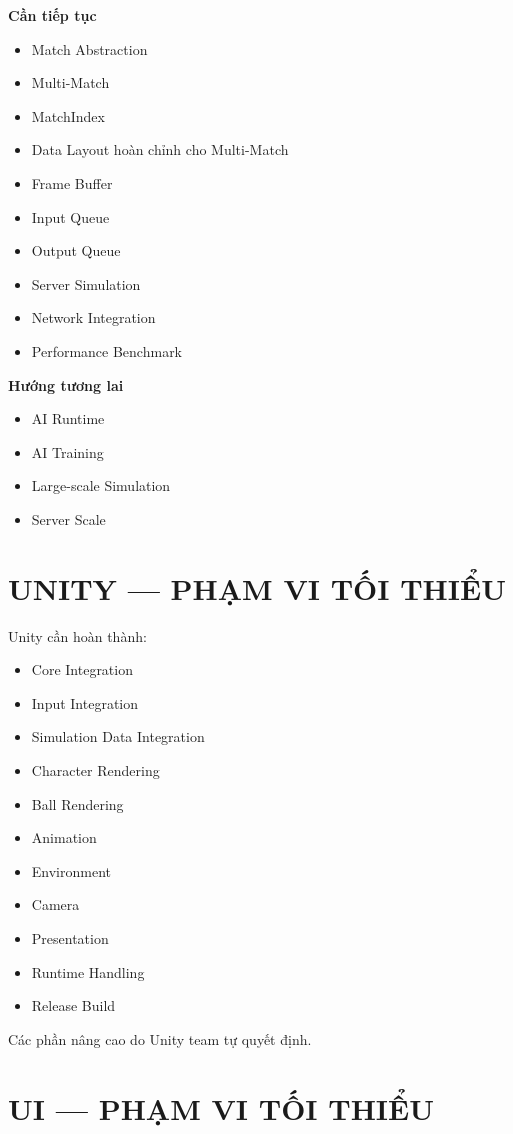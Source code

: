 \documentclass[12pt,a4paper]{article}
\begin{document}
\textbf{Cần tiếp tục}
\begin{itemize}[nosep]
  \item Match Abstraction
  \item Multi-Match
  \item MatchIndex
  \item Data Layout hoàn chỉnh cho Multi-Match
  \item Frame Buffer
  \item Input Queue
  \item Output Queue
  \item Server Simulation
  \item Network Integration
  \item Performance Benchmark
\end{itemize}

\textbf{Hướng tương lai}
\begin{itemize}[nosep]
  \item AI Runtime
  \item AI Training
  \item Large-scale Simulation
  \item Server Scale
\end{itemize}

\section{UNITY --- PHẠM VI TỐI THIỂU}

Unity cần hoàn thành:
\begin{itemize}[nosep]
  \item Core Integration
  \item Input Integration
  \item Simulation Data Integration
  \item Character Rendering
  \item Ball Rendering
  \item Animation
  \item Environment
  \item Camera
  \item Presentation
  \item Runtime Handling
  \item Release Build
\end{itemize}

Các phần nâng cao do Unity team tự quyết định.

\section{UI --- PHẠM VI TỐI THIỂU}
\end{document}
